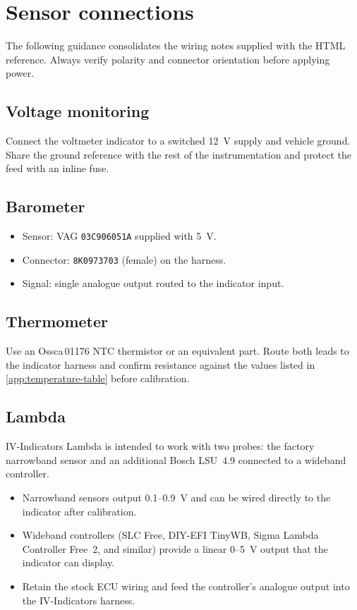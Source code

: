 \chapter{Sensor connections}\label{ch:connections}

The following guidance consolidates the wiring notes supplied with the HTML reference. Always verify polarity and connector orientation before applying power.

\section{Voltage monitoring}
Connect the voltmeter indicator to a switched 12~V supply and vehicle ground. Share the ground reference with the rest of the instrumentation and protect the feed with an inline fuse.

\section{Barometer}
\begin{itemize}
    \item Sensor: VAG \texttt{03C906051A} supplied with 5~V.
    \item Connector: \texttt{8K0973703} (female) on the harness.
    \item Signal: single analogue output routed to the indicator input.
\end{itemize}

\section{Thermometer}
Use an Ossca\,01176 NTC thermistor or an equivalent part. Route both leads to the indicator harness and confirm resistance against the values listed in \autoref{app:temperature-table} before calibration.

\section{Lambda}
IV-Indicators Lambda is intended to work with two probes: the factory narrowband sensor and an additional Bosch LSU~4.9 connected to a wideband controller.
\begin{itemize}
    \item Narrowband sensors output 0.1--0.9~V and can be wired directly to the indicator after calibration.
    \item Wideband controllers (SLC Free, DIY-EFI TinyWB, Sigma Lambda Controller Free~2, and similar) provide a linear 0--5~V output that the indicator can display.
    \item Retain the stock ECU wiring and feed the controller's analogue output into the IV-Indicators harness.
\end{itemize}

